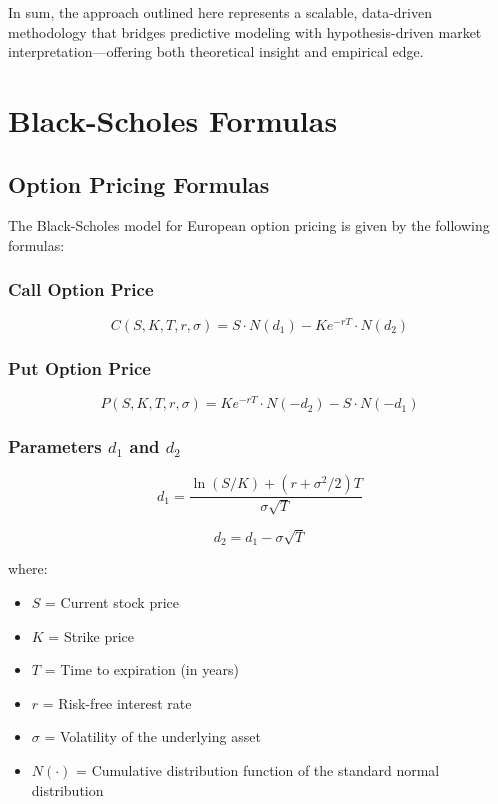 \documentclass{article}
\begin{document}
In sum, the approach outlined here represents a scalable, data-driven methodology that bridges predictive modeling with hypothesis-driven market interpretation—offering both theoretical insight and empirical edge.


\appendix
\section{Black-Scholes Formulas}
\subsection{Option Pricing Formulas}
The Black-Scholes model for European option pricing is given by the following formulas:

\subsubsection{Call Option Price}
\begin{equation}
C(S, K, T, r, \sigma) = S \cdot N(d_1) - K e^{-rT} \cdot N(d_2)
\end{equation}

\subsubsection{Put Option Price}
\begin{equation}
P(S, K, T, r, \sigma) = K e^{-rT} \cdot N(-d_2) - S \cdot N(-d_1)
\end{equation}

\subsubsection{Parameters $d_1$ and $d_2$}
\begin{equation}
d_1 = \frac{\ln(S/K) + (r + \sigma^2/2)T}{\sigma\sqrt{T}}
\end{equation}

\begin{equation}
d_2 = d_1 - \sigma\sqrt{T}
\end{equation}

where:
\begin{itemize}
  \item $S$ = Current stock price
  \item $K$ = Strike price
  \item $T$ = Time to expiration (in years)
  \item $r$ = Risk-free interest rate
  \item $\sigma$ = Volatility of the underlying asset
  \item $N(\cdot)$ = Cumulative distribution function of the standard normal distribution
\end{itemize}
\end{document}
